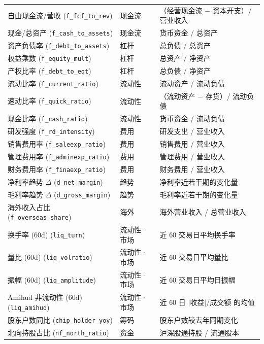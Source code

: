 \documentclass[UTF8, a4paper, fontset=none, zihao=-4]{ctexrep}
\begin{document}
\begin{longtable}{@{}>{\raggedright\arraybackslash}p{3.9cm}>{\raggedright\arraybackslash}p{2.0cm}>{\raggedright\arraybackslash}p{8.5cm}@{}}
自由现金流/营收 (\texttt{\scriptsize f\_fcf\_to\_rev}) & 现金流 & （经营现金流 $-$ 资本开支）/ 营业收入 \\
现金/总资产 (\texttt{\scriptsize f\_cash\_to\_assets}) & 现金流 & 货币资金 / 总资产 \\
资产负债率 (\texttt{\scriptsize f\_debt\_to\_assets}) & 杠杆 & 总负债 / 总资产 \\
权益乘数 (\texttt{\scriptsize f\_equity\_mult}) & 杠杆 & 总资产 / 净资产 \\
产权比率 (\texttt{\scriptsize f\_debt\_to\_eqt}) & 杠杆 & 总负债 / 净资产 \\
流动比率 (\texttt{\scriptsize f\_current\_ratio}) & 流动性 & 流动资产 / 流动负债 \\
速动比率 (\texttt{\scriptsize f\_quick\_ratio}) & 流动性 & （流动资产 $-$ 存货）/ 流动负债 \\
现金比率 (\texttt{\scriptsize f\_cash\_ratio}) & 流动性 & 货币资金 / 流动负债 \\
研发强度 (\texttt{\scriptsize f\_rd\_intensity}) & 费用 & 研发支出 / 营业收入 \\
销售费用率 (\texttt{\scriptsize f\_saleexp\_ratio}) & 费用 & 销售费用 / 营业收入 \\
管理费用率 (\texttt{\scriptsize f\_adminexp\_ratio}) & 费用 & 管理费用 / 营业收入 \\
财务费用率 (\texttt{\scriptsize f\_finaexp\_ratio}) & 费用 & 财务费用 / 营业收入 \\
净利率趋势 $\Delta$ (\texttt{\scriptsize d\_net\_margin}) & 趋势 & 净利率近若干期的变化量 \\
毛利率趋势 $\Delta$ (\texttt{\scriptsize d\_gross\_margin}) & 趋势 & 毛利率近若干期的变化量 \\
海外收入占比 (\texttt{\scriptsize f\_overseas\_share}) & 海外 & 海外营业收入 / 总营业收入 \\
换手率 (60d) (\texttt{\scriptsize liq\_turn}) & 流动性·市场 & 近 $60$ 交易日平均换手率 \\
量比 (60d) (\texttt{\scriptsize liq\_volratio}) & 流动性·市场 & 近 $60$ 交易日平均量比 \\
振幅 (60d) (\texttt{\scriptsize liq\_amplitude}) & 流动性·市场 & 近 $60$ 交易日平均日振幅 \\
Amihud 非流动性 (60d) (\texttt{\scriptsize liq\_amihud}) & 流动性·市场 & 近 $60$ 日 $|$收益$|$/成交额 的均值 \\
股东户数同比 (\texttt{\scriptsize chip\_holder\_yoy}) & 筹码 & 股东户数较去年同期变化 \\
北向持股占比 (\texttt{\scriptsize nf\_north\_ratio}) & 资金 & 沪深股通持股 / 流通股本 \\

\end{longtable}
\end{document}
